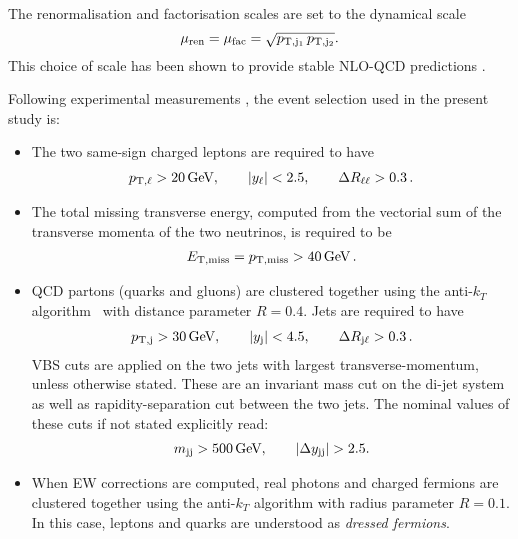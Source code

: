 The renormalisation and factorisation scales are set to the dynamical scale
%
\begin{equation}
\label{eq:defscale}
 \mu_{\rm ren} = \mu_{\rm fac} = \sqrt{p_{\rm T, j_1}\, p_{\rm T, j_2}}.
\end{equation}
%
This choice of scale has been shown to provide stable NLO-QCD predictions \cite{Denner:2012dz}.

Following experimental measurements \cite{Aad:2014zda,Aaboud:2016ffv,Khachatryan:2014sta,CMS:2017adb}, the event selection used in the present study is:

\begin{itemize}
    \item The two same-sign charged leptons are required to have
        \begin{align}
        \label{cut:1}
         p_{\text{T},\ell} >  20\,\text{GeV},\qquad |y_{\ell}| < 2.5, \qquad \Delta R_{\ell\ell}> 0.3\,.
        \end{align}
    \item The total missing transverse energy, computed from the vectorial sum of the transverse momenta of the two neutrinos, is required to be
        \begin{align}
        \label{cut:2}
          E_{\text{T},\text{miss}}=p_{\rm T, miss} >  40\,\text{GeV}\,.
        \end{align}
    \item QCD partons (quarks and gluons) are clustered together using the anti-$k_T$ algorithm~\cite{Cacciari:2008gp} with distance parameter $R=0.4$. Jets are required
        to have
        \begin{align}
        \label{cut:3}
         p_{\text{T},\text{j}} >  30\,\text{GeV}, \qquad |y_\text{j}| < 4.5, \qquad \Delta R_{\text{j}\ell} > 0.3 \,.
        \end{align}
        VBS cuts are applied on the two jets with largest transverse-momentum, unless otherwise stated.
        These are an in\-vari\-ant mass cut on the di-jet system as well as rapidity-separation cut between the two jets.
        The nominal values of these cuts if not stated explicitly read:
        \begin{align}
        \label{cut:4}
         m_{\text{j} \text{j}} >  500\,\text{GeV},\qquad |\Delta y_{\text{j} \text{j}}| > 2.5.
        \end{align}
    \item When EW corrections are computed, real photons and charged fermions are clustered together using the anti-$k_T$ algorithm with
        radius parameter $R=0.1$. In this case, leptons and quarks are understood as {\it dressed fermions}.
\end{itemize}
